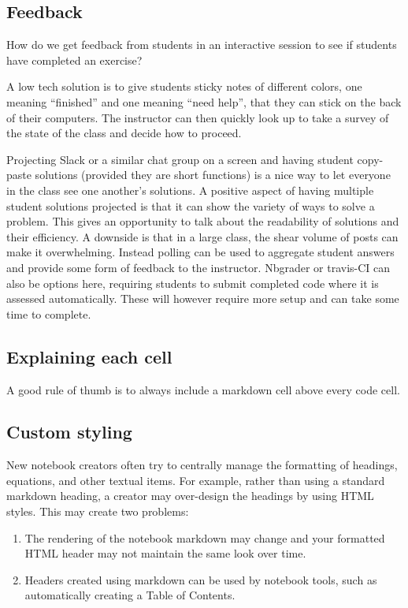 \documentclass[]{book}
\begin{document}
\subsection{Feedback}\label{feedback}

How do we get feedback from students in an interactive session to see if
students have completed an exercise?

A low tech solution is to give students sticky notes of different
colors, one meaning ``finished'' and one meaning ``need help'', that
they can stick on the back of their computers. The instructor can then
quickly look up to take a survey of the state of the class and decide
how to proceed.

Projecting Slack or a similar chat group on a screen and having student
copy-paste solutions (provided they are short functions) is a nice way
to let everyone in the class see one another's solutions. A positive
aspect of having multiple student solutions projected is that it can
show the variety of ways to solve a problem. This gives an opportunity
to talk about the readability of solutions and their efficiency. A
downside is that in a large class, the shear volume of posts can make it
overwhelming. Instead polling can be used to aggregate student answers
and provide some form of feedback to the instructor. Nbgrader or
travis-CI can also be options here, requiring students to submit
completed code where it is assessed automatically. These will however
require more setup and can take some time to complete.

\subsection{Explaining each cell}\label{explaining-each-cell}

A good rule of thumb is to always include a markdown cell above every
code cell.

\subsection{Custom styling}\label{custom-styling}

New notebook creators often try to centrally manage the formatting of
headings, equations, and other textual items. For example, rather than
using a standard markdown heading, a creator may over-design the
headings by using HTML styles. This may create two problems:

\begin{enumerate}
\def\labelenumi{\arabic{enumi}.}
\item
  The rendering of the notebook markdown may change and your formatted
  HTML header may not maintain the same look over time.
\item
  Headers created using markdown can be used by notebook tools, such as
  automatically creating a Table of Contents.
\end{enumerate}
\end{document}
